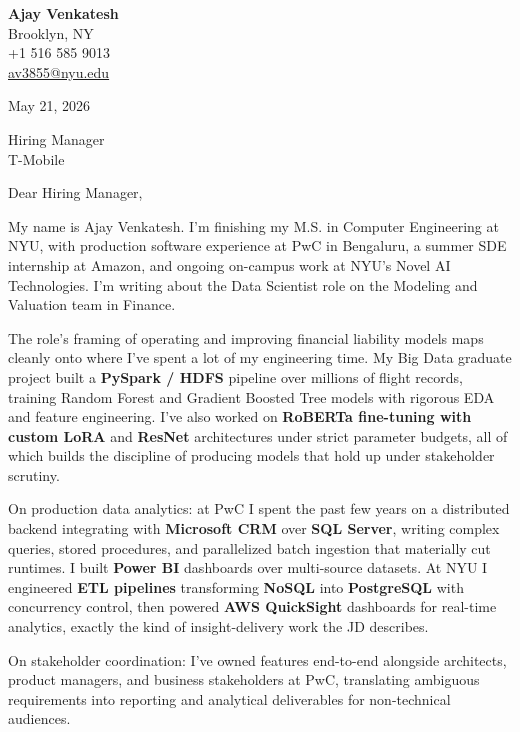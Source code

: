 \documentclass[letterpaper,11pt]{article}
\begin{document}
\begin{flushleft}
\textbf{\large Ajay Venkatesh} \\
Brooklyn, NY \\
+1 516 585 9013 \\
\href{mailto:av3855@nyu.edu}{av3855@nyu.edu}
\end{flushleft}
\vspace{10pt}
May 21, 2026
\vspace{6pt}

Hiring Manager \\
T-Mobile

\vspace{10pt}

Dear Hiring Manager,

My name is Ajay Venkatesh. I'm finishing my M.S. in Computer Engineering at NYU, with production software experience at PwC in Bengaluru, a summer SDE internship at Amazon, and ongoing on-campus work at NYU's Novel AI Technologies. I'm writing about the Data Scientist role on the Modeling and Valuation team in Finance.

The role's framing of operating and improving financial liability models maps cleanly onto where I've spent a lot of my engineering time. My Big Data graduate project built a \textbf{PySpark / HDFS} pipeline over millions of flight records, training Random Forest and Gradient Boosted Tree models with rigorous EDA and feature engineering. I've also worked on \textbf{RoBERTa fine-tuning with custom LoRA} and \textbf{ResNet} architectures under strict parameter budgets, all of which builds the discipline of producing models that hold up under stakeholder scrutiny.

On production data analytics: at PwC I spent the past few years on a distributed backend integrating with \textbf{Microsoft CRM} over \textbf{SQL Server}, writing complex queries, stored procedures, and parallelized batch ingestion that materially cut runtimes. I built \textbf{Power BI} dashboards over multi-source datasets. At NYU I engineered \textbf{ETL pipelines} transforming \textbf{NoSQL} into \textbf{PostgreSQL} with concurrency control, then powered \textbf{AWS QuickSight} dashboards for real-time analytics, exactly the kind of insight-delivery work the JD describes.

On stakeholder coordination: I've owned features end-to-end alongside architects, product managers, and business stakeholders at PwC, translating ambiguous requirements into reporting and analytical deliverables for non-technical audiences.
\end{document}
